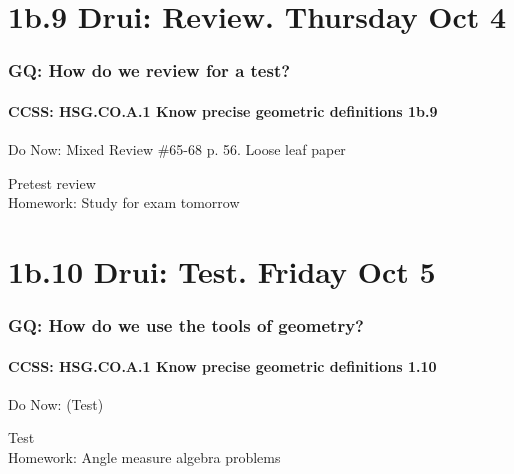 \documentclass{beamer}
\begin{document}
\section{1b.9 Drui: Review. Thursday Oct 4}
\frame
{
  \frametitle{GQ: How do we review for a test?}
  \framesubtitle{CCSS: HSG.CO.A.1 Know precise geometric definitions  \alert{1b.9}}

  \begin{block}{Do Now: Mixed Review \#65-68 p. 56. Loose leaf paper}
  \end{block}
  Pretest review\\
  \vspace{0.5cm}
  Homework: Study for \alert{exam tomorrow}
}

\section{1b.10 Drui: Test. Friday Oct 5}
        \frame
        {
          \frametitle{GQ: How do we use the tools of geometry?}
          \framesubtitle{CCSS: HSG.CO.A.1 Know precise geometric definitions  \alert{1.10}}

          \begin{block}{Do Now: (Test)}
          \end{block}
          Test\\
          \vspace{1cm}
          Homework: Angle measure algebra problems
        }
\end{document}
